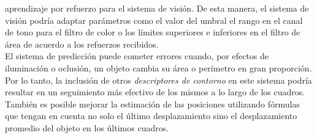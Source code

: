 aprendizaje por refuerzo para el sistema de visi\'on. De esta manera, el 
sistema de visi\'on podr\'ia adaptar par\'ametros como el valor del umbral 
el rango en el canal de tono para el filtro de color o los l\'imites 
superiores e inferiores en el filtro de \'area de acuerdo a los 
refuerzos recibidos.\\
\indent El sistema de predicci\'on puede cometer errores cuando, por 
efectos de iluminaci\'on o oclusi\'on, un objeto cambia su \'area o 
per\'imetro en gran proporci\'on. Por lo tanto, la inclusi\'on de otros 
\emph{descriptores de contorno} en este sistema podr\'ia resultar en un 
seguimiento m\'as efectivo de los mismos a lo largo de los cuadros. 
Tambi\'en es posible mejorar la estimaci\'on de las posiciones utilizando 
f\'ormulas que tengan en cuenta no solo el \'ultimo desplazamiento sino 
el desplazamiento promedio del objeto en los \'ultimos cuadros.


